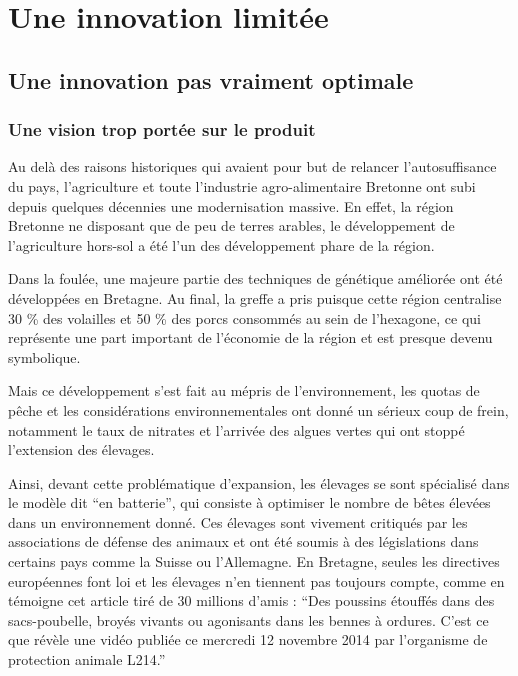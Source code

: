 \documentclass[a4paper,12pt]{report}
\begin{document}
\chapter{Une innovation limitée}

	\section{Une innovation pas vraiment optimale}
	
		\subsection{Une vision trop portée sur le produit}
			Au delà des raisons historiques qui avaient pour but de relancer l’autosuffisance du pays, l’agriculture et toute l’industrie agro-alimentaire Bretonne ont subi depuis quelques décennies une modernisation massive. En effet, la région Bretonne ne disposant que de peu de terres arables, le développement de l’agriculture hors-sol a été l’un des développement phare de la région. 
			
			Dans la foulée, une majeure partie des techniques de génétique améliorée ont été développées en Bretagne. Au final, la greffe a pris puisque cette région centralise 30 \% des volailles et 50 \% des porcs consommés au sein de l’hexagone, ce qui représente une part important de l’économie de la région et est presque devenu symbolique.
			
			Mais ce développement s’est fait au mépris de l’environnement, les quotas de pêche et les considérations environnementales ont donné un sérieux coup de frein, notamment le taux de nitrates et l’arrivée des algues vertes qui ont stoppé l’extension des élevages.
			
			Ainsi, devant cette problématique d’expansion, les élevages se sont spécialisé dans le modèle dit “en batterie”, qui consiste à optimiser le nombre de bêtes élevées dans un environnement donné. Ces élevages sont vivement critiqués par les associations de défense des animaux  et ont été soumis à des législations dans certains pays comme la Suisse ou l’Allemagne. En Bretagne, seules les directives européennes font loi et les élevages n’en tiennent pas toujours compte, comme en témoigne cet article tiré de 30 millions d’amis\cite{BretagnePoussinsBroyesEtouffesDansCouvoir} : “Des poussins étouffés dans des sacs-poubelle, broyés vivants ou agonisants dans les bennes à ordures. C'est ce que révèle une vidéo publiée ce mercredi 12 novembre 2014 par l’organisme de protection animale L214.”
			
\end{document}

